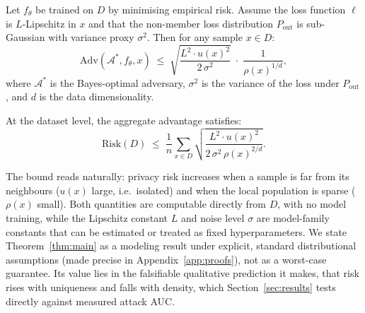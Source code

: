 \begin{theorem}
\label{thm:main}
Let $f_\theta$ be trained on $D$ by minimising empirical risk.
Assume the loss function $\ell$ is $L$-Lipschitz in $x$ and that the
non-member loss distribution $P_{\mathrm{out}}$ is sub-Gaussian with
variance proxy $\sigma^2$.
Then for any sample $x \in D$:
\begin{equation}
  \mathrm{Adv}(\mathcal{A}^*, f_\theta, x)
  \;\leq\;
  \sqrt{\frac{L^2 \cdot u(x)^2}{2\,\sigma^2}}
  \;\cdot\;
  \frac{1}{\rho(x)^{1/d}},
  \label{eq:bound}
\end{equation}
where $\mathcal{A}^*$ is the Bayes-optimal adversary,
$\sigma^2$ is the variance of the loss under $P_{\mathrm{out}}$,
and $d$ is the data dimensionality.

At the dataset level, the aggregate advantage satisfies:
\begin{equation}
  \mathrm{Risk}(D)
  \;\leq\;
  \frac{1}{n}\sum_{x \in D}
  \sqrt{\frac{L^2 \cdot u(x)^2}{2\,\sigma^2\,\rho(x)^{2/d}}}.
  \label{eq:risk_bound}
\end{equation}
\end{theorem}

The bound reads naturally: privacy risk increases when a sample is far
from its neighbours ($u(x)$ large, i.e.\ isolated) and when the local
population is sparse ($\rho(x)$ small). Both quantities are computable
directly from $D$, with no model training, while the Lipschitz constant
$L$ and noise level $\sigma$ are model-family constants that can be
estimated or treated as fixed hyperparameters. We state
Theorem~\ref{thm:main} as a modeling result under explicit, standard
distributional assumptions (made precise in Appendix~\ref{app:proofs}),
not as a worst-case guarantee. Its value lies in the falsifiable
qualitative prediction it makes, that risk rises with uniqueness and
falls with density, which Section~\ref{sec:results} tests directly
against measured attack AUC.

